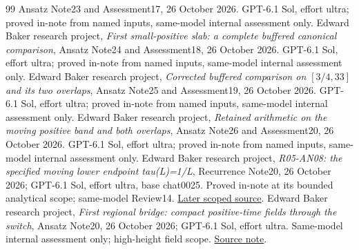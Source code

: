 \documentclass[11pt]{article}
\numberwithin{equation}{section}
\begin{document}
\begin{thebibliography}{99}
Ansatz Note23 and Assessment17, 26 October 2026.
GPT-6.1 Sol, effort ultra; proved in-note from named inputs,
same-model internal assessment only.
 Edward Baker research project,
\emph{First small-positive slab: a complete buffered canonical comparison},
Ansatz Note24 and Assessment18, 26 October 2026.
GPT-6.1 Sol, effort ultra; proved in-note from named inputs,
same-model internal assessment only.
 Edward Baker research project,
\emph{Corrected buffered comparison on $[3/4,33]$ and its two overlaps},
Ansatz Note25 and Assessment19, 26 October 2026.
GPT-6.1 Sol, effort ultra; proved in-note from named inputs,
same-model internal assessment only.
 Edward Baker research project,
\emph{Retained arithmetic on the moving positive band and both overlaps},
Ansatz Note26 and Assessment20, 26 October 2026.
GPT-6.1 Sol, effort ultra; proved in-note from named inputs,
same-model internal assessment only.
 Edward Baker research project,
\emph{R05-AN08: the specified moving lower endpoint tau(L)=1/L},
Recurrence Note20, 26 October 2026; GPT-6.1 Sol, effort ultra,
base chat0025. Proved in-note at its bounded analytical scope;
same-model Review14.
\href{../../../papers/investigations-5/01_heat_density_asymptotics/recurrence/notes/20_MOVING_LOWER_ENDPOINT_20261026.md}{Later scoped source}.
 Edward Baker research project,
\emph{First regional bridge: compact positive-time fields through the
switch}, Ansatz Note20, 26 October 2026; GPT-6.1 Sol, effort ultra.
Same-model internal assessment only; high-height field scope.
\href{../../../papers/investigations-5/01_heat_density_asymptotics/ansatz/notes/20_COMPACT_POSITIVE_FIELD_BRIDGE_20261026.md}{Source note}.


\end{thebibliography}
\end{document}
